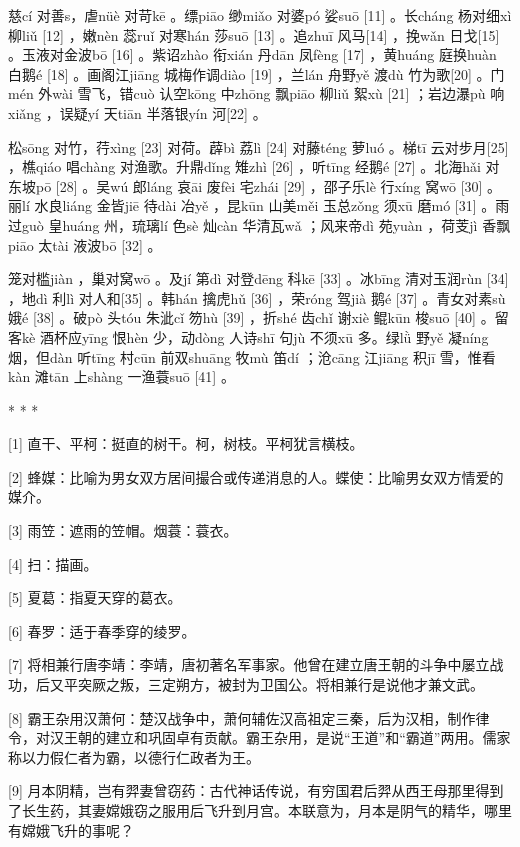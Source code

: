 \documentclass[12pt,UTF8]{ctexbook}
\begin{document}
慈cí 对善s，虐nüè 对苛kē 。缥piāo 缈miǎo 对婆pó 娑suō [11] 。长cháng 杨对细xì 柳liǔ [12] ，嫩nèn 蕊ruǐ 对寒hán 莎suō [13] 。追zhuī 风马[14] ，挽wǎn 日戈[15] 。玉液对金波bō [16] 。紫诏zhào 衔xián 丹dān 凤fèng [17] ，黄huáng 庭换huàn 白鹅é [18] 。画阁江jiāng 城梅作调diào [19] ，兰lán 舟野yě 渡dù 竹为歌[20] 。门mén 外wài 雪飞，错cuò 认空kōng 中zhōng 飘piāo 柳liǔ 絮xù [21] ；岩边瀑pù 响xiǎng ，误疑yí 天tiān 半落银yín 河[22] 。

松sōng 对竹，荇xìng [23] 对荷。薜bì 荔lì [24] 对藤téng 萝luó 。梯tī 云对步月[25] ，樵qiáo 唱chàng 对渔歌。升鼎dǐng 雉zhì [26] ，听tīng 经鹅é [27] 。北海hǎi 对东坡pō [28] 。吴wú 郎láng 哀āi 废fèi 宅zhái [29] ，邵子乐lè 行xíng 窝wō [30] 。丽lí 水良liáng 金皆jiē 待dài 冶yě ，昆kūn 山美měi 玉总zǒng 须xū 磨mó [31] 。雨过guò 皇huáng 州，琉璃lí 色sè 灿càn 华清瓦wǎ ；风来帝dì 苑yuàn ，荷芰jì 香飘piāo 太tài 液波bō [32] 。

笼对槛jiàn ，巢对窝wō 。及jí 第dì 对登dēng 科kē [33] 。冰bīng 清对玉润rùn [34] ，地dì 利lì 对人和[35] 。韩hán 擒虎hǔ [36] ，荣róng 驾jià 鹅é [37] 。青女对素sù 娥é [38] 。破pò 头tóu 朱泚cǐ 笏hù [39] ，折shé 齿chǐ 谢xiè 鲲kūn 梭suō [40] 。留客kè 酒杯应yīng 恨hèn 少，动dòng 人诗shī 句jù 不须xū 多。绿lǜ 野yě 凝níng 烟，但dàn 听tīng 村cūn 前双shuāng 牧mù 笛dí ；沧cāng 江jiāng 积jī 雪，惟看kàn 滩tān 上shàng 一渔蓑suō [41] 。



* * *



[1] 直干、平柯：挺直的树干。柯，树枝。平柯犹言横枝。

[2] 蜂媒：比喻为男女双方居间撮合或传递消息的人。蝶使：比喻男女双方情爱的媒介。

[3] 雨笠：遮雨的笠帽。烟蓑：蓑衣。

[4] 扫：描画。

[5] 夏葛：指夏天穿的葛衣。

[6] 春罗：适于春季穿的绫罗。

[7] 将相兼行唐李靖：李靖，唐初著名军事家。他曾在建立唐王朝的斗争中屡立战功，后又平突厥之叛，三定朔方，被封为卫国公。将相兼行是说他才兼文武。

[8] 霸王杂用汉萧何：楚汉战争中，萧何辅佐汉高祖定三秦，后为汉相，制作律令，对汉王朝的建立和巩固卓有贡献。霸王杂用，是说“王道”和“霸道”两用。儒家称以力假仁者为霸，以德行仁政者为王。

[9] 月本阴精，岂有羿妻曾窃药：古代神话传说，有穷国君后羿从西王母那里得到了长生药，其妻嫦娥窃之服用后飞升到月宫。本联意为，月本是阴气的精华，哪里有嫦娥飞升的事呢？
\end{document}
